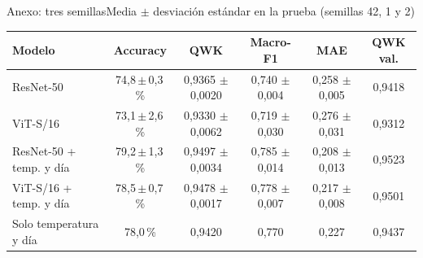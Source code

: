 \documentclass[aspectratio=169,11pt,table]{beamer}
\begin{document}
\begin{frame}{Anexo: tres semillas}{Media $\pm$ desviación estándar en la prueba (semillas 42, 1 y 2)}
{\scriptsize
\centering
\begin{tabular}{lccccc}
\toprule
\rowcolor{verdeosc}\color{white}\bfseries Modelo & \color{white}\bfseries Accuracy & \color{white}\bfseries QWK & \color{white}\bfseries Macro-F1 & \color{white}\bfseries MAE & \color{white}\bfseries QWK val. \\
\midrule
ResNet-50 & 74{,}8\,$\pm$\,0{,}3\,\% & 0{,}9365 $\pm$ 0{,}0020 & 0{,}740 $\pm$ 0{,}004 & 0{,}258 $\pm$ 0{,}005 & 0{,}9418 \\
ViT-S/16 & 73{,}1\,$\pm$\,2{,}6\,\% & 0{,}9330 $\pm$ 0{,}0062 & 0{,}719 $\pm$ 0{,}030 & 0{,}276 $\pm$ 0{,}031 & 0{,}9312 \\
ResNet-50 + temp. y día & 79{,}2\,$\pm$\,1{,}3\,\% & 0{,}9497 $\pm$ 0{,}0034 & 0{,}785 $\pm$ 0{,}014 & 0{,}208 $\pm$ 0{,}013 & 0{,}9523 \\
ViT-S/16 + temp. y día & 78{,}5\,$\pm$\,0{,}7\,\% & 0{,}9478 $\pm$ 0{,}0017 & 0{,}778 $\pm$ 0{,}007 & 0{,}217 $\pm$ 0{,}008 & 0{,}9501 \\
Solo temperatura y día & 78{,}0\,\% & 0{,}9420 & 0{,}770 & 0{,}227 & 0{,}9437 \\
\bottomrule
\end{tabular}
}
\end{frame}
\end{document}
